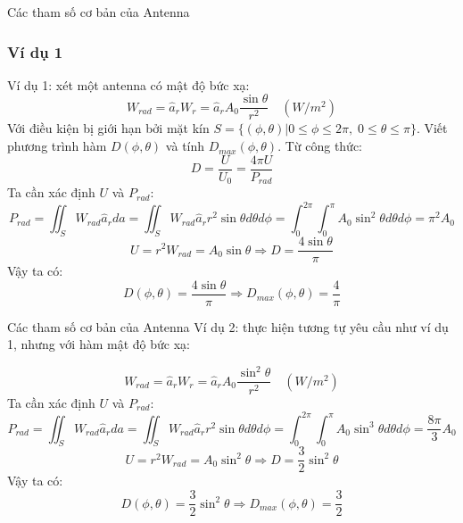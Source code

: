 \documentclass[8pt]{beamer}
\begin{document}
\begin{frame}{Các tham số cơ bản của Antenna}
\subsubsection{Ví dụ 1}
Ví dụ 1: xét một antenna có mật độ bức xạ:
$$W_{rad}=\hat a_{r}W_{r}=\hat a_{r}A_{0}\frac{\sin{\theta}}{r^2}\quad(W/m^2)$$
Với điều kiện bị giới hạn bởi mặt kín $S=\{(\phi,\theta)|0\leq\phi\leq2\pi,\;0\leq\theta\leq\pi\}$. Viết phương trình hàm $D(\phi,\theta)$ và tính $D_{max}(\phi,\theta)$.
Từ công thức: $$D=\frac{U}{U_{0}}=\frac{4\pi U}{P_{rad}}$$
Ta cần xác định $U$ và $P_{rad}$:
$$P_{rad}=\iint_{S}W_{rad}\hat a_{r}da=\iint_{S}W_{rad}\hat a_{r}r^2\sin{\theta}d\theta d\phi=\int_{0}^{2\pi}\int_{0}^{\pi}A_{0}\sin^2{\theta}d\theta d\phi=\pi^2A_{0}$$
$$U=r^2W_{rad}=A_{0}\sin{\theta}\Rightarrow D=\frac{4\sin{\theta}}{\pi}$$
Vậy ta có:
$$D(\phi,\theta)=\frac{4\sin{\theta}}{\pi}\Rightarrow D_{max}(\phi,\theta)=\frac{4}{\pi}$$

\end{frame}
\begin{frame}{Các tham số cơ bản của Antenna}
Ví dụ 2: thực hiện tương tự yêu cầu như ví dụ 1, nhưng với hàm mật độ bức xạ:

$$W_{rad}=\hat a_{r}W_{r}=\hat a_{r}A_{0}\frac{\sin^2{\theta}}{r^2}\quad(W/m^2)$$
Ta cần xác định $U$ và $P_{rad}$:
$$P_{rad}=\iint_{S}W_{rad}\hat a_{r}da=\iint_{S}W_{rad}\hat a_{r}r^2\sin{\theta}d\theta d\phi=\int_{0}^{2\pi}\int_{0}^{\pi}A_{0}\sin^3{\theta}d\theta d\phi=\frac{8\pi}{3}A_{0}$$
$$U=r^2W_{rad}=A_{0}\sin^2{\theta}\Rightarrow D=\frac{3}{2}\sin^2{\theta}$$
Vậy ta có:
$$D(\phi,\theta)=\frac{3}{2}\sin^2{\theta}\Rightarrow D_{max}(\phi,\theta)=\frac{3}{2}$$
\end{frame}
\end{document}
